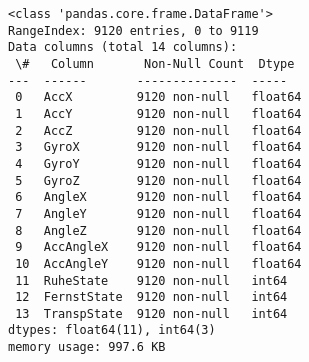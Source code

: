 \documentclass[11pt]{article}
\begin{document}
    \begin{Verbatim}[commandchars=\\\{\}]
<class 'pandas.core.frame.DataFrame'>
RangeIndex: 9120 entries, 0 to 9119
Data columns (total 14 columns):
 \#   Column       Non-Null Count  Dtype
---  ------       --------------  -----
 0   AccX         9120 non-null   float64
 1   AccY         9120 non-null   float64
 2   AccZ         9120 non-null   float64
 3   GyroX        9120 non-null   float64
 4   GyroY        9120 non-null   float64
 5   GyroZ        9120 non-null   float64
 6   AngleX       9120 non-null   float64
 7   AngleY       9120 non-null   float64
 8   AngleZ       9120 non-null   float64
 9   AccAngleX    9120 non-null   float64
 10  AccAngleY    9120 non-null   float64
 11  RuheState    9120 non-null   int64
 12  FernstState  9120 non-null   int64
 13  TranspState  9120 non-null   int64
dtypes: float64(11), int64(3)
memory usage: 997.6 KB
    \end{Verbatim}
\end{document}
